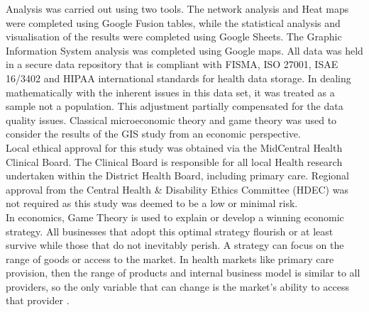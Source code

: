 \documentclass[11pt,a4paper]{article}
\begin{document}
Analysis was carried out using two tools. The network analysis and Heat maps were completed using Google Fusion tables, while the statistical analysis and visualisation of the results were completed using Google Sheets. The Graphic Information System analysis was completed using Google maps. All data was held in a secure data repository that is compliant with FISMA, ISO 27001, ISAE 16/3402 and HIPAA international standards for health data storage. In dealing mathematically  with the inherent issues in this data set, it was treated as a sample not a population. This adjustment partially compensated for the data quality issues. Classical microeconomic theory and game theory was used to consider the results of the GIS study from an economic perspective. \\

Local ethical approval for this study was obtained via the MidCentral Health Clinical Board. The Clinical Board is responsible for all local Health research undertaken within the District Health Board, including primary care.  Regional approval from the Central Health \& Disability Ethics Committee (HDEC) was not required as this study was deemed to be  a low or minimal risk. \\

In economics, Game Theory is used to explain or develop a winning economic strategy. All businesses that adopt this optimal strategy flourish or at least survive while those that do not inevitably perish. A strategy can focus on the range of goods or access to the market. In health markets like primary care provision, then the range of products and internal business model is similar to all providers, so the  only variable that can change is the market's ability to access that provider \citep{dinar2008game}. \\
\end{document}
